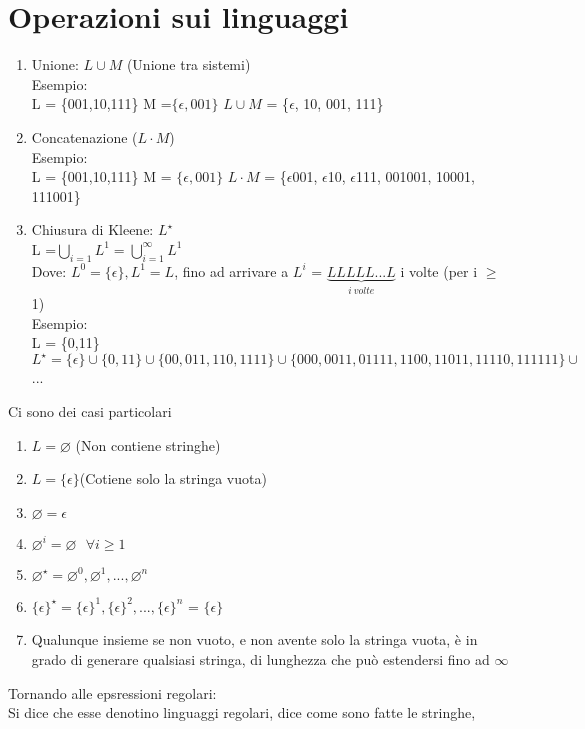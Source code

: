 \documentclass[12pt, a4paper, openany, oneside]{book}
\begin{document}
\section{Operazioni sui linguaggi}
\begin{enumerate}
	\item Unione: $L \cup M$ (Unione tra sistemi)\\
	Esempio:\\
	L = \{001,10,111\}
	M =$ \{\epsilon,001\}$
	$L \cup M$ = \{$\epsilon$, 10, 001, 111\}
	\item Concatenazione ($L\cdot M$)\\
	Esempio: \\
	L = \{001,10,111\}
	M = $\{\epsilon,001\}$
	$L \cdot M$ = \{$\epsilon$001, $\epsilon$10, $\epsilon$111, 001001, 10001, 111001\}	 
	\item Chiusura di Kleene: $L^{\star}$ \\
	L =$ \bigcup \limits _{i=1} L^{1} = \bigcup \limits _{i=1}^{\infty} L^{1}$\\
	Dove: $L^{0} = \{\epsilon\}, L^{1} = L$, fino ad arrivare a $L^{i}$ =
	$\underbrace{LLLLL...L}_{i~volte} $	i volte (per i $\geq$ 1)\\
	Esempio: \\
	L = \{0,11\} \\
	$L^{\star} = \{\epsilon\} \cup \{0,11\} \cup \{00,011,110,1111\} \cup 
	\{000,0011,01111,1100,11011,11110,111111\} \cup$ ...
\end{enumerate}
Ci sono dei casi particolari 
\begin{enumerate}
	\item $L = \varnothing $ (Non contiene stringhe)
	\item $L = \{\epsilon\} $(Cotiene solo la stringa vuota)
	\item $\varnothing = {\epsilon}$
	\item$ \varnothing^{i} = \varnothing ~~~ \forall i\geq1$
	\item $\varnothing^{\star} = \varnothing^{0}, \varnothing^{1}, ..., 
	\varnothing^{n}$
	\item $\{\epsilon\}^{\star} = \{\epsilon\}^{1}, \{\epsilon\}^{2}, ...,
	\{\epsilon\}^{n}$  = $\{\epsilon\}$
	\item Qualunque insieme se non vuoto, e non avente solo la stringa vuota,
	è in grado di generare qualsiasi stringa, di lunghezza che può estendersi
	fino ad $\infty$
\end{enumerate}
Tornando alle epsressioni regolari: \\
Si dice che esse denotino linguaggi regolari, dice come sono fatte le stringhe, 
\end{document}
